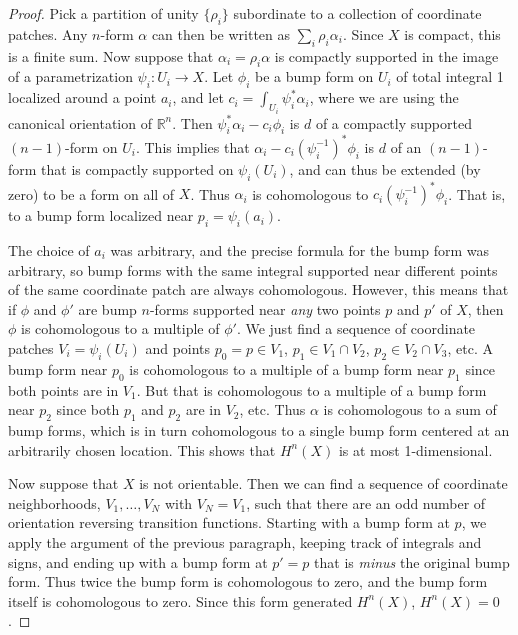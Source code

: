 \documentclass[12pt]{amsbook}
\newcommand{\R}{{\mathbb R}}
\theoremstyle{definition}
\begin{document}
\begin{proof}
Pick a partition of unity $\{ \rho_i\}$ subordinate to a collection of
coordinate patches. Any $n$-form $\alpha$ can then be written as
$\sum_i \rho_i \alpha_i$. Since $X$ is compact, this is a finite sum.
Now suppose that $\alpha_i = \rho_i \alpha$ is compactly supported in
the image of a parametrization $\psi_i: U_i \to X$.  Let $\phi_i$ be a
bump form on $U_i$ of total integral 1 localized around a point $a_i$,
and let $c_i = \int_{U_i} \psi_i^* \alpha_i$, where we are using the
canonical orientation of $\R^n$.  Then $\psi_i^*\alpha_i - c_i \phi_i$
is $d$ of a compactly supported $(n-1)$-form on $U_i$.  This implies
that $\alpha_i - c_i (\psi_i^{-1})^* \phi_i$ is $d$ of an $(n-1)$-form
that is compactly supported on $\psi_i(U_i)$, and can thus be extended
(by zero) to be a form on all of $X$. Thus $\alpha_i$ is cohomologous
to $c_i (\psi_i^{-1})^*\phi_i$.  That is, to a bump form localized
near $p_i = \psi_i(a_i)$.

The choice of $a_i$ was arbitrary, and the precise formula for the
bump form was arbitrary, so bump forms with the same integral
supported near different points of the same coordinate patch are
always cohomologous. However, this means that if $\phi$ and $\phi'$ are
bump $n$-forms supported
near {\em any} two points $p$ and $p'$ of $X$, then $\phi$ is cohomologous
to a multiple of $\phi'$. We
just find a sequence of coordinate patches $V_i=\psi_i(U_i)$ and
points $p_0=p \in V_1$, $p_1 \in V_1 \cap V_2$, $p_2 \in V_2 \cap
V_3$, etc. A bump form near $p_0$ is cohomologous to a multiple of a 
bump form near
$p_1$ since both points are in $V_1$. But that is cohomologous to a
multiple of a bump form near $p_2$ since both $p_1$ and $p_2$ are in $V_2$, etc.
Thus $\alpha$ is cohomologous to a sum of bump forms, which is in turn
cohomologous to a single bump form centered at an arbitrarily chosen
location. This shows that $H^n(X)$ is at most 1-dimensional.

Now suppose that $X$ is not orientable. Then we can find a sequence of
coordinate neighborhoods, $V_1,\ldots, V_N$ with $V_N=V_1$, such that
there are an odd number of orientation reversing transition
functions. Starting with a bump form at $p$, we apply the argument of
the previous paragraph, keeping track of integrals and signs, and 
ending up with a
bump form at $p'=p$ that is {\em minus} the original bump form. Thus twice
the bump form is cohomologous to zero, and the bump form itself is
cohomologous to zero. Since this form generated $H^n(X)$, $H^n(X)=0$.

\end{proof}
\end{document}
